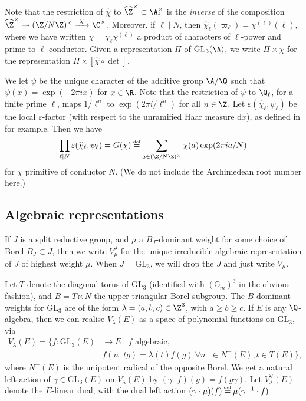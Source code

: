 \documentclass[10pt,reqno,a4paper]{amsart}
\newcommand{\chihat}{\widehat{\chi}}
\newcommand{\subf}{_{\mathrm{f}}}
\newcommand{\GL}{\mathrm{GL}}
\begin{document}
Note that the restriction of $\chihat$ to $\widehat{\Z}^\times \subset \A\subf^\times$ is the \emph{inverse} of the composition $\widehat{\Z}^\times \twoheadrightarrow (\Z / N\Z)^\times \xrightarrow{\ \chi\ } \C^\times$. Moreover, if $\ell \mid N$, then $\widehat{\chi}_\ell(\varpi_\ell) = \chi^{(\ell)}(\ell)$, where we have written $\chi = \chi_\ell \chi^{(\ell)}$ a product of characters of $\ell$-power and prime-to-$\ell$ conductor. Given a representation $\Pi$ of $\GL_3(\A)$, we write $\Pi \times \chi$ for the representation $\Pi \times [\chihat \circ \det]$.

We let $\psi$ be the unique character of the additive group $\A / \Q$ such that $\psi(x) = \exp(-2\pi i x)$ for $x \in \R$. Note that the restriction of $\psi$ to $\Q_\ell$, for a finite prime $\ell$, maps $1/\ell^n$ to $\exp(2\pi i / \ell^n)$ for all $n \in \Z$.   Let $\varepsilon(\chihat_\ell,\psi_\ell)$ be the local $\varepsilon$-factor (with respect to the unramified Haar measure $\mathrm{d}x$), as defined in \cite{Tat79} for example. Then we have
\[
\prod_{\ell \mid N} \varepsilon(\chihat_\ell, \psi_\ell) = G(\chi) \defeq \sum_{a \in (\Z/ N\Z)^\times} \chi(a) \exp(2\pi i a / N)
\]
for $\chi$ primitive of conductor $N$. (We do not include the Archimedean root number here.)



\subsection{Algebraic representations}\label{sec:alg rep}

If $J$ is a split reductive group, and $\mu$ a $B_J$-dominant weight for some choice of Borel $B_J \subset J$, then we write $V_\mu^J$ for the unique irreducible algebraic representation of $J$ of highest weight $\mu$. When $J = \GL_3$, we will drop the $J$ and just write $V_\mu$.

Let $T$ denote the diagonal torus of $\GL_3$ (identified with $(\mathbb{G}_m)^3$ in the obvious fashion), and $B = T\ltimes N$ the upper-triangular Borel subgroup. The $B$-dominant weights for $\GL_3$ are of the form $\lambda = (a,b,c) \in \Z^3$, with $a \ge b \ge c$. If $E$ is any $\Q$-algebra, then we can realise $V_\lambda(E)$ as a space of polynomial functions on $\GL_3$, via
\begin{align*}
V_\lambda(E) = \{ f : \GL_3(E)& \to E \ : \ f\text{ algebraic, }\\
& f(n^-tg) = \lambda(t)f(g) \ \forall n^- \in N^-(E), t \in T(E)\},
\end{align*}
where $N^-(E)$ is the unipotent radical of the opposite Borel. We get a natural left-action of $\gamma \in \GL_3(E)$ on $V_\lambda(E)$ by $(\gamma \cdot f)(g) = f(g\gamma)$. Let $V_\lambda^\vee(E)$ denote the $E$-linear dual, with the dual left action $(\gamma \cdot \mu)(f) \defeq \mu(\gamma^{-1} \cdot f)$.
\end{document}
